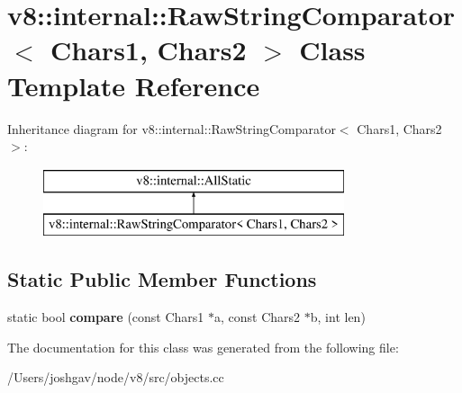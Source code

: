 \hypertarget{classv8_1_1internal_1_1_raw_string_comparator}{}\section{v8\+:\+:internal\+:\+:Raw\+String\+Comparator$<$ Chars1, Chars2 $>$ Class Template Reference}
\label{classv8_1_1internal_1_1_raw_string_comparator}
Inheritance diagram for v8\+:\+:internal\+:\+:Raw\+String\+Comparator$<$ Chars1, Chars2 $>$\+:\begin{figure}[H]
\begin{center}
\leavevmode
\includegraphics[height=2.000000cm]{classv8_1_1internal_1_1_raw_string_comparator}
\end{center}
\end{figure}
\subsection*{Static Public Member Functions}
\begin{DoxyCompactItemize}
\item 
static bool {\bfseries compare} (const Chars1 $\ast$a, const Chars2 $\ast$b, int len)\hypertarget{classv8_1_1internal_1_1_raw_string_comparator_ae347b3b0e50985f71e1cba006255acf2}{}\label{classv8_1_1internal_1_1_raw_string_comparator_ae347b3b0e50985f71e1cba006255acf2}

\end{DoxyCompactItemize}


The documentation for this class was generated from the following file\+:\begin{DoxyCompactItemize}
\item 
/\+Users/joshgav/node/v8/src/objects.\+cc\end{DoxyCompactItemize}
